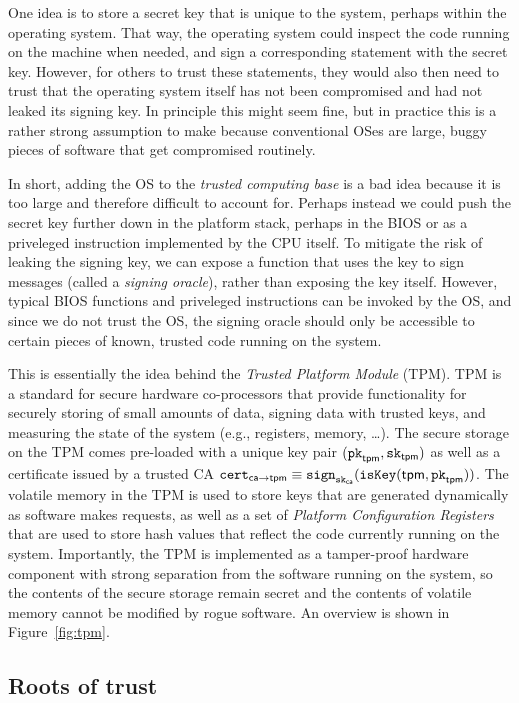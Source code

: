 \documentclass[11pt,twoside]{scrartcl}
\begin{document}
One idea is to store a secret key that is unique to the system, perhaps within the operating system. That way, the operating system could inspect the code running on the machine when needed, and sign a corresponding statement with the secret key. However, for others to trust these statements, they would also then need to trust that the operating system itself has not been compromised and had not leaked its signing key. In principle this might seem fine, but in practice this is a rather strong assumption to make because conventional OSes are large, buggy pieces of software that get compromised routinely. 

In short, adding the OS to the \emph{trusted computing base} is a bad idea because it is too large and therefore difficult to account for. Perhaps instead we could push the secret key further down in the platform stack, perhaps in the BIOS or as a priveleged instruction implemented by the CPU itself. To mitigate the risk of leaking the signing key, we can expose a function that uses the key to sign messages (called a \emph{signing oracle}), rather than exposing the key itself. However, typical BIOS functions and priveleged instructions can be invoked by the OS, and since we do not trust the OS, the signing oracle should only be accessible to certain pieces of known, trusted code running on the system.

This is essentially the idea behind the \emph{Trusted Platform Module} (TPM). TPM is a standard for secure hardware co-processors that provide functionality for securely storing of small amounts of data, signing data with trusted keys, and measuring the state of the system (e.g., registers, memory, \ldots). The secure storage on the TPM comes pre-loaded with a unique key pair $(\texttt{\upshape pk}_{\mathsf{tpm}}, \texttt{\upshape sk}_{\mathsf{tpm}})$ as well as a certificate issued by a trusted CA $\texttt{\upshape cert}_{\mathsf{ca} \to \mathsf{tpm}} \equiv \texttt{\upshape sign}_{\texttt{\upshape sk}_{\mathsf{ca}}}(\texttt{\upshape isKey}(\mathsf{tpm},\texttt{\upshape pk}_{\mathsf{tpm}}))$. The volatile memory in the TPM is used to store keys that are generated dynamically as software makes requests, as well as a set of \emph{Platform Configuration Registers} that are used to store hash values that reflect the code currently running on the system. Importantly, the TPM is implemented as a tamper-proof hardware component with strong separation from the software running on the system, so the contents of the secure storage remain secret and the contents of volatile memory cannot be modified by rogue software. An overview is shown in Figure~\ref{fig:tpm}.

\subsection{Roots of trust}
\end{document}
